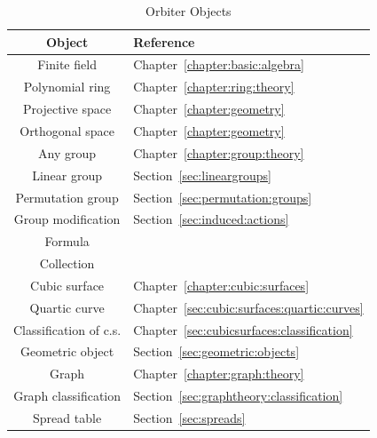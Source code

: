 \begin{table}
	\begin{center}
	{\renewcommand{\arraystretch}{2.1}
	\begin{tabular}{|c|l|}
		\hline
		Object & Reference \\
		\hline
		\hline
		Finite field & Chapter~\ref{chapter:basic:algebra} \\
		\hline
		Polynomial ring & Chapter~\ref{chapter:ring:theory} \\
		\hline
		Projective space & Chapter~\ref{chapter:geometry}\\
		\hline
		Orthogonal space & Chapter~\ref{chapter:geometry}\\
		\hline
		Any group & Chapter~\ref{chapter:group:theory}\\
		\hline
		Linear group & Section~\ref{sec:lineargroups}\\
		\hline
		Permutation group & Section~\ref{sec:permutation:groups}\\
		\hline
		Group modification & Section~\ref{sec:induced:actions}\\
		\hline
		Formula & \\
		\hline
		Collection & \\
		\hline
		Cubic surface & Chapter~\ref{chapter:cubic:surfaces} \\
		\hline
		Quartic curve & Chapter~\ref{sec:cubic:surfaces:quartic:curves} \\
		\hline
		Classification of c.s. & Chapter~\ref{sec:cubicsurfaces:classification} \\
		\hline
		Geometric object & Section~\ref{sec:geometric:objects} \\
		\hline
		Graph & Chapter~\ref{chapter:graph:theory} \\
		\hline
		Graph classification & Section~\ref{sec:graphtheory:classification} \\
		\hline
		Spread table & Section~\ref{sec:spreads}\\
		\hline
		\end{tabular}}
	\end{center}
	\caption{\label{tab:objects:1}Orbiter Objects}
\end{table}
